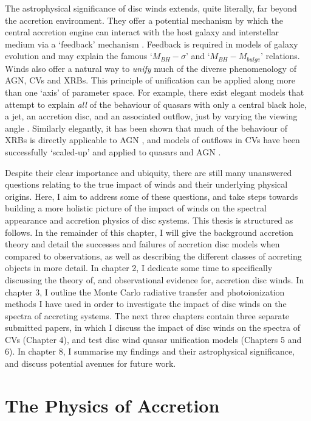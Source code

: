 The astrophysical significance of disc winds extends, quite literally, 
far beyond the accretion environment. They offer a potential mechanism by which the central
accretion engine can interact with the host galaxy and interstellar medium 
via a `feedback' mechanism \citep{king2003,fabian2012}. 
Feedback is required in models of galaxy evolution \citep{springel2005}
and may explain the famous `$M_{BH}-\sigma$' \citep{silkrees1998,haring2004}
and `$M_{BH}-M_{bulge}$' \citep{magorrian1998} relations.
Winds also offer a natural way to {\em unify} much
of the diverse phenomenology of AGN, CVs and XRBs. This principle of unification
can be applied along more than one `axis' of parameter space. For example, 
there exist elegant models that attempt to explain {\em all}
of the behaviour of quasars with only a central black hole, a jet, an accretion disc,
and an associated outflow, just by varying the viewing angle \citep{elvis2000}.
Similarly elegantly, it has been shown that much of the behaviour of XRBs
is directly applicable to AGN \citep{mchardy2006}, 
and models of outflows in CVs have been successfully `scaled-up'
and applied to quasars and AGN \citep[e.g.][]{higginbottom2013}.

Despite their clear importance and ubiquity, there are still
many unanswered questions relating to the true impact of winds and their underlying
physical origins. Here, I aim to address some of these questions, and 
take steps towards building a more holistic picture of the impact
of winds on the spectral appearance and accretion physics of disc systems.
This thesis is structured as follows. In the remainder of this chapter, 
I will give the background accretion theory 
and detail the successes and failures of accretion 
disc models when compared to observations,
as well as describing the different classes of accreting objects in more detail. 
In chapter 2, I dedicate some time to specifically discussing the theory of,
and observational evidence for, accretion disc winds. In chapter 3, I outline 
the Monte Carlo radiative transfer and photoionization
methods I have used in order to investigate the impact of disc 
winds on the spectra of accreting systems. The next three chapters
contain three separate submitted papers, in which I discuss the impact
of disc winds on the spectra of CVs (Chapter 4), and test disc wind
quasar unification models (Chapters 5 and 6).
In chapter 8, I summarise my findings and their astrophysical significance, 
and discuss potential avenues for future work.


\section{The Physics of Accretion}

